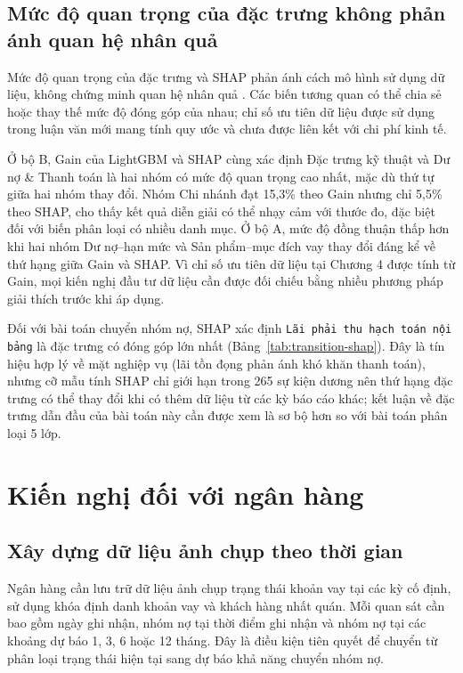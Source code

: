 \subsection{Mức độ quan trọng của đặc trưng không phản ánh quan hệ nhân quả}
\label{sec:limit-importance}

Mức độ quan trọng của đặc trưng và SHAP phản ánh cách mô hình sử dụng dữ liệu, không chứng minh quan hệ nhân quả \cite{lundberg2017unified}. Các biến tương quan có thể chia sẻ hoặc thay thế mức độ đóng góp của nhau; chỉ số ưu tiên dữ liệu được sử dụng trong luận văn mới mang tính quy ước và chưa được liên kết với chi phí kinh tế.

Ở bộ B, Gain của LightGBM và SHAP cùng xác định Đặc trưng kỹ thuật và Dư nợ \& Thanh toán là hai nhóm có mức độ quan trọng cao nhất, mặc dù thứ tự giữa hai nhóm thay đổi. Nhóm Chi nhánh đạt 15,3\% theo Gain nhưng chỉ 5,5\% theo SHAP, cho thấy kết quả diễn giải có thể nhạy cảm với thước đo, đặc biệt đối với biến phân loại có nhiều danh mục. Ở bộ A, mức độ đồng thuận thấp hơn khi hai nhóm Dư nợ--hạn mức và Sản phẩm--mục đích vay thay đổi đáng kể về thứ hạng giữa Gain và SHAP. Vì chỉ số ưu tiên dữ liệu tại Chương 4 được tính từ Gain, mọi kiến nghị đầu tư dữ liệu cần được đối chiếu bằng nhiều phương pháp giải thích trước khi áp dụng.

Đối với bài toán chuyển nhóm nợ, SHAP xác định \texttt{Lãi phải thu hạch toán nội bảng} là đặc trưng có đóng góp lớn nhất (Bảng~\ref{tab:transition-shap}). Đây là tín hiệu hợp lý về mặt nghiệp vụ (lãi tồn đọng phản ánh khó khăn thanh toán), nhưng cỡ mẫu tính SHAP chỉ giới hạn trong 265 sự kiện dương nên thứ hạng đặc trưng có thể thay đổi khi có thêm dữ liệu từ các kỳ báo cáo khác; kết luận về đặc trưng dẫn đầu của bài toán này cần được xem là sơ bộ hơn so với bài toán phân loại 5 lớp.

\section{Kiến nghị đối với ngân hàng}

\subsection{Xây dựng dữ liệu ảnh chụp theo thời gian}

Ngân hàng cần lưu trữ dữ liệu ảnh chụp trạng thái khoản vay tại các kỳ cố định, sử dụng khóa định danh khoản vay và khách hàng nhất quán. Mỗi quan sát cần bao gồm ngày ghi nhận, nhóm nợ tại thời điểm ghi nhận và nhóm nợ tại các khoảng dự báo 1, 3, 6 hoặc 12 tháng. Đây là điều kiện tiên quyết để chuyển từ phân loại trạng thái hiện tại sang dự báo khả năng chuyển nhóm nợ.

